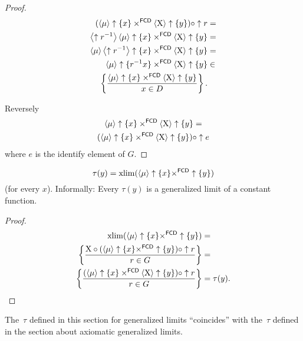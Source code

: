\begin{proof}
~
\begin{align*}
(\left\langle \mu\right\rangle\uparrow\{x\}\times^{\mathsf{FCD}}\left\langle \mathrm{X}\right\rangle\uparrow\{y\})\circ\uparrow r & =\\
\left\langle \uparrow r^{-1}\right\rangle\left\langle \mu\right\rangle\uparrow\{x\}\times^{\mathsf{FCD}}\left\langle \mathrm{X}\right\rangle\uparrow\{y\} & =\\
\left\langle \mu\right\rangle\left\langle \uparrow r^{-1}\right\rangle\uparrow\{x\}\times^{\mathsf{FCD}}\left\langle \mathrm{X}\right\rangle\uparrow\{y\} & =\\
\left\langle \mu\right\rangle\uparrow\{r^{-1}x\}\times^{\mathsf{FCD}}\left\langle \mathrm{X}\right\rangle\uparrow\{y\} & \in \\ \left\{ \frac{\left\langle \mu\right\rangle\uparrow\{x\}\times^{\mathsf{FCD}}\left\langle \mathrm{X}\right\rangle\uparrow\{y\}}{x\in D}\right\}.
\end{align*}


Reversely
\begin{multline*}
\left\langle \mu\right\rangle\uparrow\{x\}\times^{\mathsf{FCD}}\left\langle \mathrm{X}\right\rangle\uparrow\{y\}=\\(\left\langle \mu\right\rangle\uparrow\{x\}\times^{\mathsf{FCD}}\left\langle \mathrm{X}\right\rangle\uparrow\{y\})\circ\uparrow e
\end{multline*}
where $e$ is the identify element of $G$.\end{proof}

\begin{prop}
\[ \tau(y)=\operatorname{xlim}(\left\langle \mu\right\rangle\uparrow\{x\}\times^{\mathsf{FCD}}\uparrow\{y\}) \]
(for every $x$). Informally: Every $\tau(y)$ is a generalized limit
of a constant function.
\end{prop}

\begin{proof}
~
\begin{align*}
\operatorname{xlim}(\left\langle \mu\right\rangle\uparrow\{x\}\times^{\mathsf{FCD}}\uparrow\{y\}) & =\\
\left\{ \frac{\mathrm{X}\circ(\left\langle \mu\right\rangle\uparrow\{x\}\times^{\mathsf{FCD}}\uparrow\{y\})\circ\uparrow r}{r\in G}\right\} & =\\
\left\{ \frac{(\left\langle \mu\right\rangle\uparrow\{x\}\times^{\mathsf{FCD}}\left\langle \mathrm{X}\right\rangle\uparrow\{y\})\circ\uparrow r}{r\in G}\right\} & =\tau(y).
\end{align*}
\end{proof}

\begin{cor}
The~$\tau$ defined in this section for generalized limits ``coincides'' with the~$\tau$ defined in the section about axiomatic generalized limits.
\end{cor}

